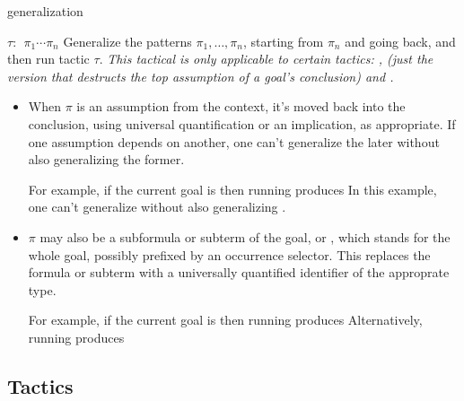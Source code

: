 \begin{tactic}{generalization}
  \begin{tsyntax}[empty]{$\tau$: $\;\pi_1 \cdots \pi_n$}
    Generalize the patterns $\pi_1, \ldots, \pi_n$, starting from
    $\pi_n$ and going back, and then run tactic $\tau$.  \emph{This
      tactical is only applicable to certain tactics: ,
       (just the version that destructs the top
      assumption of a goal's conclusion) and .}

    \begin{itemize}
    \item When $\pi$ is an assumption from the context, it's moved
      back into the conclusion, using universal quantification or an
      implication, as appropriate. If one assumption depends on
      another, one can't generalize the later without also
      generalizing the former.

      For example, if the current goal is
       then
      running 
      produces
       In
      this example, one can't generalize  without also
      generalizing .

    \item $\pi$ may also be a subformula or subterm of the goal, or
      \ec{_}, which stands for the whole goal, possibly prefixed by an
      occurrence selector. This replaces the formula or subterm with a
      universally quantified identifier of the approprate type.

      For example, if the current goal is
       then
      running 
      produces
      Alternatively, running
      produces
    \end{itemize}
  \end{tsyntax}
\end{tactic}

\subsection{Tactics}













